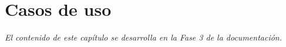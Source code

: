 \chapter{Casos de uso}\label{cap:cu}

\textit{El contenido de este capítulo se desarrolla en la Fase 3 de la documentación.}

